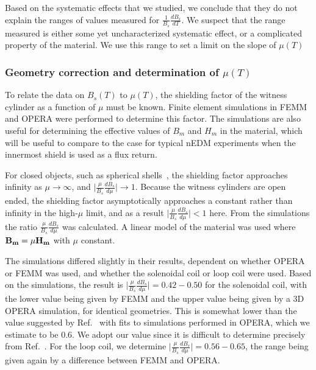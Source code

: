 Based on the systematic effects that we studied, we conclude that they
do not explain the ranges of values measured for
$\frac{1}{B_s}\frac{dB_s}{dT}$.  We suspect that the range measured is
either some yet uncharacterized systematic effect, or a complicated
property of the material. We use this range to set a limit on the
slope of $\mu(T)$


\subsubsection{Geometry correction and determination of $\mu(T)$\label{sec:axialsims}}

To relate the data on $B_s(T)$ to $\mu(T)$, the shielding factor of
the witness cylinder as a function of $\mu$ must be known. Finite
element simulations in FEMM and OPERA were performed to determine this
factor.  The simulations are also useful for determining the effective
values of $B_m$ and $H_m$ in the material, which will be useful to
compare to the case for typical nEDM experiments when the innermost
shield is used as a flux return.

For closed objects, such as spherical
shells~\cite{bidinosti2014passive, urankar1996design}, the shielding
factor approaches infinity as $\mu \rightarrow \infty$, and
$\vert\frac{\mu}{B_s}\frac{dB_s}{d\mu}\vert\rightarrow 1$.  Because
the witness cylinders are open ended, the shielding factor
asymptotically approaches a constant rather than infinity in the
high-$\mu$ limit, and as a result
$\vert\frac{\mu}{B_s}\frac{dB_s}{d\mu}\vert<1$ here.  From the
simulations the ratio $\frac{\mu}{B_s}\frac{dB_s}{d\mu}$ was
calculated.  A linear model of the material was used where
$\bold{B_m}=\mu\bold{H_m}$ with $\mu$ constant.


The simulations differed slightly in their results, dependent on
whether OPERA or FEMM was used, and whether the solenoidal coil or
loop coil were used.  Based on the simulations, the result is
$\vert\frac{\mu}{B_s}\frac{dB_s}{d\mu}\vert=0.42-0.50$ for the
solenoidal coil, with the lower value being given by FEMM and the
upper value being given by a 3D OPERA simulation, for identical
geometries.  This is somewhat lower than the value suggested by
Ref.~\cite{paperno1999charts} with fits to simulations performed
in OPERA, which we estimate to be 0.6.  We adopt our value since it is
difficult to determine precisely from
Ref.~\cite{paperno1999charts}.  For the loop coil, we determine
$\vert\frac{\mu}{B_s}\frac{dB_s}{d\mu}\vert=0.56-0.65$, the range
being given again by a difference between FEMM and OPERA.

